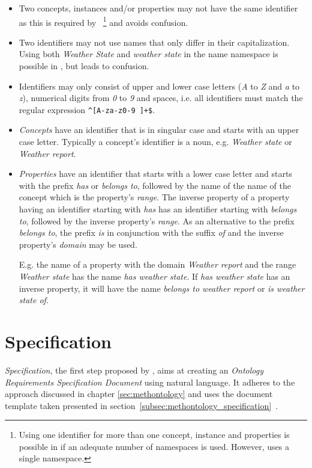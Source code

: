 \begin{itemize}
  \item Two concepts, instances and/or properties may not have the same identifier as this is required by ~\cite{OWL}\footnote{Using one identifier for more than one concept, instance and properties is possible in  if an adequate number of namespaces is used. However, \smarthomeweather uses a single namespace.} and avoids confusion.
  \item Two identifiers may not use names that only differ in their capitalization. Using both \emph{Weather State} and \emph{weather state} in the name namespace is possible in , but leads to confusion.
  \item Identifiers may only consist of upper and lower case  letters (\emph{A} to \emph{Z} and \emph{a} to \emph{z}), numerical digits from \emph{0} to \emph{9} and spaces, i.e. all identifiers must match the regular expression \texttt{\textasciicircum[A-za-z0-9~]+\$}.
  \item \emph{Concepts} have an identifier that is in singular case and starts with an upper case letter. Typically a concept's identifier is a noun, e.g. \emph{Weather state} or \emph{Weather report}.
  \item \emph{Properties} have an identifier that starts with a lower case letter and starts with the prefix \emph{has} or \emph{belongs to}, followed by the name of the name of the concept which is the property's \emph{range}. The inverse property of a property having an identifier starting with \emph{has} has an identifier starting with \emph{belongs to}, followed by the inverse property's \emph{range}. As an alternative to the prefix \emph{belongs to}, the prefix \emph{is} in conjunction with the suffix \emph{of} and the inverse property's \emph{domain} may be used.
  
  E.g. the name of a property with the domain \emph{Weather report} and the range \emph{Weather state} has the name \emph{has weather state}. If \emph{has weather state} has an inverse property, it will have the name \emph{belongs to weather report} or \emph{is weather state of}.
\end{itemize}


\section{Specification}
\label{sec:ontology_specification}

\emph{Specification}, the first step proposed by \methontology, aims at creating an \emph{Ontology Requirements Specification Document} using natural language. It adheres to the approach discussed in chapter \ref{sec:methontology} and uses the document template taken presented in section~\ref{subsec:methontology_specification}~\cite{ORSD}.

